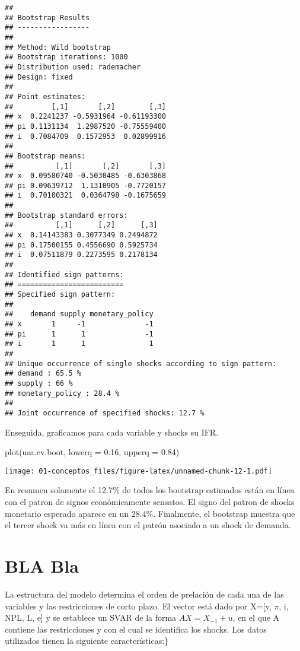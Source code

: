 \documentclass[
]{book}
\newenvironment{Shaded}{\begin{snugshade}}{\end{snugshade}}
\newcommand{\AttributeTok}[1]{\textcolor[rgb]{0.77,0.63,0.00}{#1}}
\newcommand{\FloatTok}[1]{\textcolor[rgb]{0.00,0.00,0.81}{#1}}
\newcommand{\FunctionTok}[1]{\textcolor[rgb]{0.00,0.00,0.00}{#1}}
\newcommand{\NormalTok}[1]{#1}
\begin{document}
\begin{verbatim}
## 
## Bootstrap Results
## ----------------- 
## 
## Method: Wild bootstrap
## Bootstrap iterations: 1000
## Distribution used: rademacher
## Design: fixed
## 
## Point estimates: 
##         [,1]       [,2]        [,3]
## x  0.2241237 -0.5931964 -0.61193300
## pi 0.1131134  1.2987520 -0.75559400
## i  0.7084709  0.1572953  0.02899916
## 
## Bootstrap means: 
##          [,1]       [,2]       [,3]
## x  0.09580740 -0.5030485 -0.6303868
## pi 0.09639712  1.1310905 -0.7720157
## i  0.70100321  0.0364798 -0.1675659
## 
## Bootstrap standard errors: 
##          [,1]      [,2]      [,3]
## x  0.14143383 0.3077349 0.2494872
## pi 0.17500155 0.4556690 0.5925734
## i  0.07511879 0.2273595 0.2178134
## 
## Identified sign patterns: 
## =========================
## Specified sign pattern: 
## 
##    demand supply monetary_policy
## x       1     -1              -1
## pi      1      1              -1
## i       1      1               1
## 
## Unique occurrence of single shocks according to sign pattern: 
## demand : 65.5 % 
## supply : 66 % 
## monetary_policy : 28.4 % 
## 
## Joint occurrence of specified shocks: 12.7 %
\end{verbatim}

Enseguida, graficamos para cada variable y shocks su IFR.

\begin{Shaded}
\begin{Highlighting}[]
\FunctionTok{plot}\NormalTok{(usa.cv.boot, }\AttributeTok{lowerq =} \FloatTok{0.16}\NormalTok{, }\AttributeTok{upperq =} \FloatTok{0.84}\NormalTok{)}
\end{Highlighting}
\end{Shaded}

\texttt{[image: 01-conceptos\_files/figure-latex/unnamed-chunk-12-1.pdf]}

En resumen solamente el 12.7\% de todos los bootstrap estimados están en línea con el patron de signos económicamente sensatos.
El signo del patron de shocks monetario esperado aparece en un 28.4\%. Finalmente, el bootstrap muestra que el tercer shock va más en línea con el patrón asociado a un shock de demanda.

\hypertarget{bla-bla}{%
\section{BLA Bla}\label{bla-bla}}

La estructura del modelo determina el orden de prelación de cada una de las variables y las restricciones de corto plazo.
El vector está dado por X={[}y, \(\pi\), i, NPL, L, e{]} y se establece un SVAR de la forma \(AX=X_{-1}+u\), en el que A contiene las restricciones y con el cual se identifica los shocks.
Los datos utilizados tienen la siguiente características:\}
\end{document}
